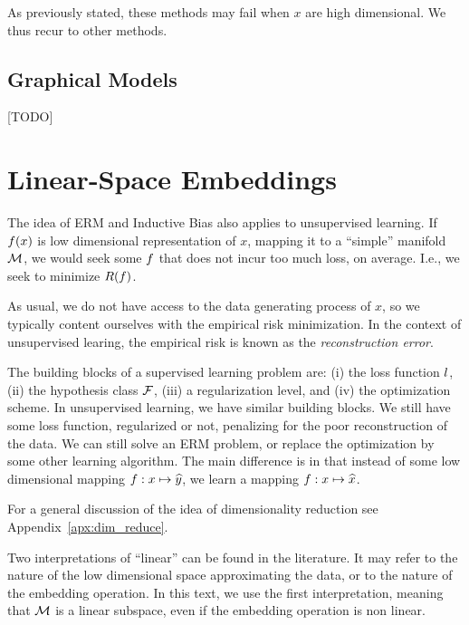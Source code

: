 As previously stated, these methods may fail when $x$ are high dimensional. We thus recur to other methods.



\subsection{Graphical Models}
\label{sec:graphical_model}
[TODO]

















\section{Linear-Space Embeddings}
\label{sec:dim_reduce_linear}


The idea of ERM and Inductive Bias also applies to unsupervised learning.
If $f(x)$ is low dimensional representation of $x$, mapping it to a ``simple'' manifold $\mathcal{M}$, we would seek some $f$ that does not incur too much loss, on average. I.e., we seek to minimize $R(f)$.

As usual, we do not have access to the data generating process of $x$, so we typically content ourselves with the empirical risk minimization.
In the context of unsupervised learing, the empirical risk is known as the \emph{reconstruction error}.

The building blocks of a supervised learning problem are: 
(i) the loss function $l$,
(ii) the hypothesis class $\mathcal{F}$, 
(iii) a regularization level, and
(iv) the optimization scheme.
In unsupervised learning, we have similar building blocks. We still have some loss function, regularized or not, penalizing for the poor reconstruction of the data. We can still solve an ERM problem, or replace the optimization by some other learning algorithm. The main difference is in that instead of some low dimensional mapping $f:x \mapsto \widehat{y}$, we learn a mapping  $f:x \mapsto \widehat{x}$.


For a general discussion of the idea of dimensionality reduction see Appendix~\ref{apx:dim_reduce}.

\begin{remark}
\label{remark:linear}
	Two interpretations of ``linear'' can be found in the literature. It may refer to the nature of the low dimensional space approximating the data, or to the nature of the embedding operation. In this text, we use the first interpretation, meaning that $\mathcal{M}$ is a linear subspace, even if the embedding operation is non linear.
\end{remark}


